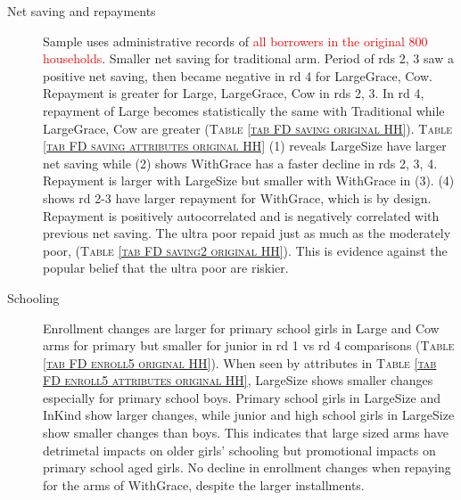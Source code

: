 \begin{description}
\vspace{1.0ex}\setlength{\itemsep}{1.0ex}\setlength{\baselineskip}{12pt}
\item[Net saving and repayments]	 Sample uses administrative records of \textcolor{red}{all borrowers in the original 800 households}. Smaller net saving for \textsf{traditional} arm. Period of rds 2, 3 saw a positive net saving, then became negative in rd 4 for \textsf{LargeGrace, Cow}. Repayment is greater for \textsf{Large, LargeGrace, Cow} in rds 2, 3. In rd 4, repayment of \textsf{Large} becomes statistically the same with \textsf{Traditional} while \textsf{LargeGrace, Cow} are greater (\textsc{Table \ref{tab FD saving original HH}}). \textsc{\normalsize Table \ref{tab FD saving attributes original HH}} (1) reveals \textsf{LargeSize} have larger net saving while (2) shows \textsf{WithGrace} has a faster decline in rds 2, 3, 4. Repayment is larger with \textsf{LargeSize} but smaller with \textsf{WithGrace} in (3). (4) shows rd 2-3 have larger repayment for \textsf{WithGrace}, which is by design. Repayment is positively autocorrelated and is negatively correlated with previous net saving. The ultra poor repaid just as much as the moderately poor, (\textsc{Table \ref{tab FD saving2 original HH}}). This is evidence against the popular belief that the ultra poor are riskier.  
\item[Schooling]	Enrollment changes are larger for primary school girls in \textsf{Large} and \textsf{Cow} arms for primary but smaller for junior in rd 1 vs rd 4 comparisons (\textsc{Table \ref{tab FD enroll5 original HH}}). When seen by attributes in \textsc{\normalsize Table \ref{tab FD enroll5 attributes original HH}}, \textsf{LargeSize} shows smaller changes especially for primary school boys. Primary school girls in \textsf{LargeSize} and \textsf{InKind} show larger changes, while junior and high school girls in \textsf{LargeSize} show smaller changes than boys. This indicates that large sized arms have detrimetal impacts on older girls' schooling but promotional impacts on primary school aged girls. No decline in enrollment changes when repaying for the arms of \textsf{WithGrace}, despite the larger installments.

\end{description}
